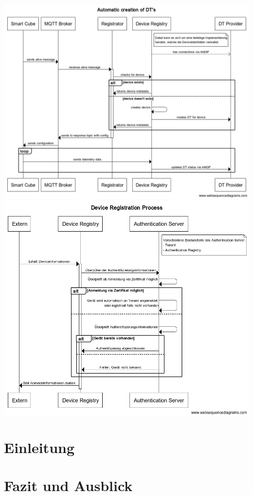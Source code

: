 \documentclass[
	12pt,
	BCOR=5mm,
	DIV=12,
	headinclude=on,
	footinclude=off,
	parskip=half,
	bibliography=totoc,
	listof=entryprefix,
	toc=listof,
	numbers=noenddot,
	plainfootsepline
]{scrreprt}
\begin{document}
\includegraphics[width=1.0\linewidth]{img/automatic_creation.png}
\includegraphics[width=1.0\linewidth]{img/device_registration.png}

\chapter{Einleitung}




\chapter{Fazit und Ausblick}

\clearpage
\ihead{}
\printbibliography[title=Literaturverzeichnis]
\cleardoublepage

\end{document}
